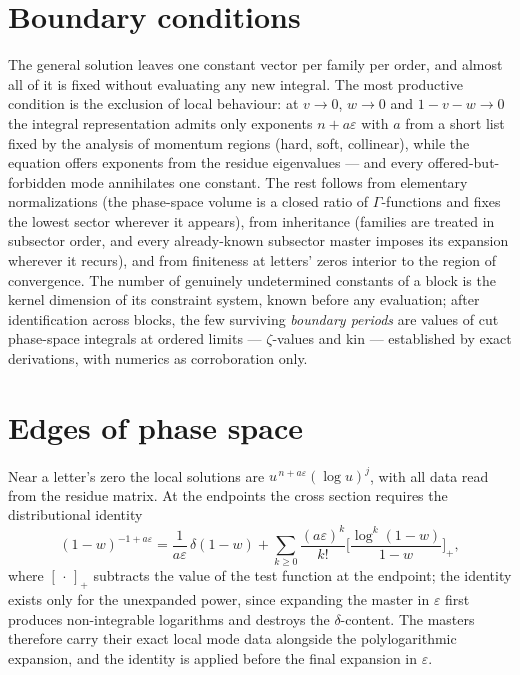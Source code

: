 \documentclass[11pt]{article}
\newcommand{\eps}{\varepsilon}
\begin{document}
\section{Boundary conditions}
The general solution leaves one constant vector per family per
order, and almost all of it is fixed without evaluating any new
integral.  The most productive condition is the exclusion of local
behaviour: at $v \to 0$, $w \to 0$ and $1-v-w \to 0$ the integral
representation admits only exponents $n + a\eps$ with $a$ from a
short list fixed by the analysis of momentum regions (hard, soft,
collinear), while the equation offers exponents from the residue
eigenvalues --- and every offered-but-forbidden mode annihilates
one constant.  The rest follows from elementary normalizations (the
phase-space volume is a closed ratio of $\Gamma$-functions and
fixes the lowest sector wherever it appears), from inheritance
(families are treated in subsector order, and every already-known
subsector master imposes its expansion wherever it recurs), and
from finiteness at letters' zeros interior to the region of
convergence.  The number of genuinely undetermined constants of a
block is the kernel dimension of its constraint system, known
before any evaluation; after identification across blocks, the few
surviving \emph{boundary periods} are values of cut phase-space
integrals at ordered limits --- $\zeta$-values and kin ---
established by exact derivations, with numerics as corroboration
only.

\section{Edges of phase space}
Near a letter's zero the local solutions are
$u^{\,n+a\eps}(\log u)^j$, with all data read from the residue
matrix.  At the endpoints the cross section requires the
distributional identity
\begin{equation}
  (1-w)^{-1+a\eps} = \frac{1}{a\eps}\,\delta(1-w)
  + \sum_{k\ge0}\frac{(a\eps)^k}{k!}
  \Big[\frac{\log^k(1-w)}{1-w}\Big]_+ ,
\end{equation}
where $[\,\cdot\,]_+$ subtracts the value of the test function at
the endpoint; the identity exists only for the unexpanded power,
since expanding the master in $\eps$ first produces non-integrable
logarithms and destroys the $\delta$-content.  The masters
therefore carry their exact local mode data alongside the
polylogarithmic expansion, and the identity is applied before the
final expansion in $\eps$.
\end{document}
